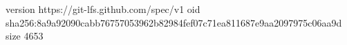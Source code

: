 version https://git-lfs.github.com/spec/v1
oid sha256:8a9a92090cabb76757053962b82984fef07c71ea811687e9aa2097975c06aa9d
size 4653
